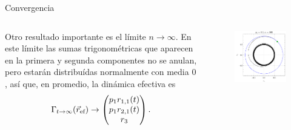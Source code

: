 \begin{frame}{Convergencia}
    \begin{columns}
        \begin{column}{0.5\textwidth}
            Otro resultado importante es el límite $n\rightarrow\infty$. En este límite las sumas trigonométricas que aparecen en la primera y segunda componentes no se anulan, pero estarán distribuídas normalmente con media $0$, así que, en promedio, la dinámica efectiva es
\begin{equation}\label{eq:MeanDynamics}
    \Gamma_{t\rightarrow\infty}(\vec{r}_{\text{ef}})\rightarrow\begin{pmatrix}
        p_{1}r_{1,1}(t)\\
        p_{1}r_{2,1}(t)\\
        r_{3}\\
    \end{pmatrix}.
\end{equation}
        \end{column}
        \begin{column}{0.5\textwidth}
           \begin{figure}
            \centering
            \includegraphics[width=1.\textwidth]{figures/maxent_results/local_all_ran_p=0.5_r=0.9_n=500_a=-3_b=3.pdf}
           \end{figure}
        \end{column}
    \end{columns}
\end{frame}



